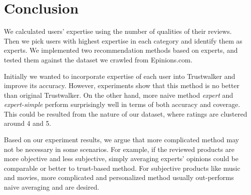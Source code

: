 \documentclass[12pt]{article}
\begin{document}
\section{Conclusion}
We calculated users' expertise using the number of qualities of their reviews. Then we pick users with highest expertise in each category and identify them as experts. We implemented two recommendation methods based on experts, and tested them against the dataset we crawled from Epinions.com. 

Initially we wanted to incorporate expertise of each user into Trustwalker and improve its accuracy. However, experiments show that this method is no better than original Trustwalker. On the other hand, more naive method \emph{expert} and \emph{expert-simple} perform surprisingly well in terms of both accuracy and coverage. This could be resulted from the nature of our dataset, where ratings are clustered around 4 and 5. 

Based on our experiment results, we argue that more complicated method may not be necessary in some scenarios. For example, if the reviewed products are more objective and less subjective, simply averaging experts' opinions could be comparable or better to trust-based method. For subjective products like music and movies, more complicated and personalized method usually out-performs naive averaging and are desired. 



\end{document}
